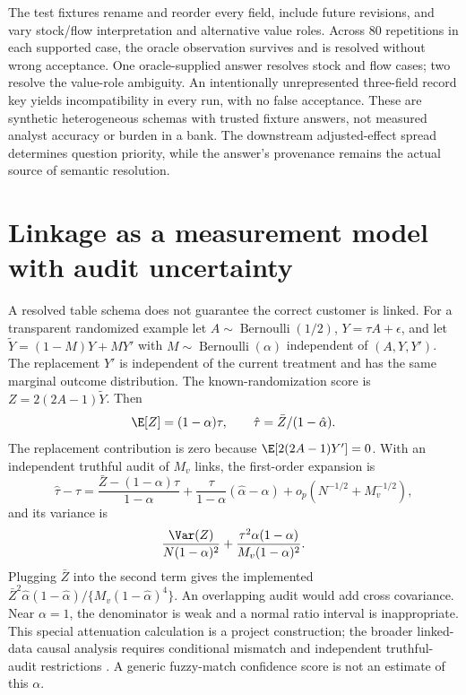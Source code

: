 The test fixtures rename and reorder every field, include future revisions,
and vary stock/flow interpretation and alternative value roles. Across 80
repetitions in each supported case, the oracle observation survives and is
resolved without wrong acceptance. One oracle-supplied answer resolves stock
and flow cases; two resolve the value-role ambiguity. An intentionally
unrepresented three-field record key yields incompatibility in every run,
with no false acceptance. These are synthetic heterogeneous schemas with
trusted fixture answers, not measured analyst accuracy or burden in a bank.
The downstream adjusted-effect spread determines question priority, while
the answer's provenance remains the actual source of semantic resolution.

\section{Linkage as a measurement model with audit uncertainty}
\label{s5:linkage}
A resolved table schema does not guarantee the correct customer is linked.
For a transparent randomized example let $A\sim\operatorname{Bernoulli}(1/2)$,
$Y=\tau A+\epsilon$, and let $\widetilde Y=(1-M)Y+MY'$ with
$M\sim\operatorname{Bernoulli}(\alpha)$ independent of $(A,Y,Y')$.
The replacement $Y'$ is independent of the current treatment and has the
same marginal outcome distribution. The known-randomization score is
$Z=2(2A-1)\widetilde Y$. Then
\[
 \E[Z]=(1-\alpha)\tau,\qquad
 \hat\tau=\bar Z/(1-\hat\alpha).
\]
The replacement contribution is zero because
$\E[2(2A-1)Y']=0$. With an independent truthful audit of $M_v$ links,
the first-order expansion is
\[
 \hat\tau-\tau=\frac{\bar Z-(1-\alpha)\tau}{1-\alpha}
 +\frac{\tau}{1-\alpha}(\hat\alpha-\alpha)+o_p(N^{-1/2}+M_v^{-1/2}),
\]
and its variance is
\begin{equation}
 \frac{\Var(Z)}{N(1-\alpha)^2}
 +\frac{\tau^2\alpha(1-\alpha)}{M_v(1-\alpha)^2}.
 \label{s5:link-variance}
\end{equation}
Plugging $\bar Z$ into the second term gives the implemented
$\bar Z^2\hat\alpha(1-\hat\alpha)/\{M_v(1-\hat\alpha)^4\}$.
An overlapping audit would add cross covariance. Near $\alpha=1$, the
denominator is weak and a normal ratio interval is inappropriate. This
special attenuation calculation is a project construction; the broader
linked-data causal analysis requires conditional mismatch and independent
truthful-audit restrictions \citep[Assumptions A1--A5]{slawski2025}.
A generic fuzzy-match confidence score is not an estimate of this $\alpha$.

